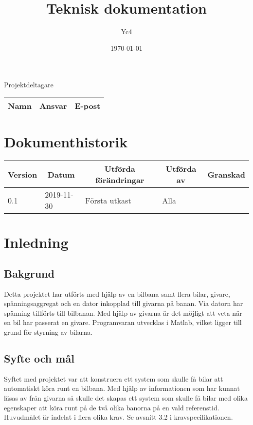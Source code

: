 \documentclass[10pt,oneside,swedish]{lips-no_customer}
\title{Teknisk dokumentation}
\author{Yc4}
\date{\today}
\begin{document}
\maketitle

\cleardoublepage
\makeprojectid

\begin{center}
  \Large Projektdeltagare
\end{center}
\begin{center}
  \begin{tabular}{|l|l|l|}
    \hline
    \textbf{Namn} & \textbf{Ansvar} & \textbf{E-post}\\
    \hline
  \end{tabular}
\end{center}

\section*{Dokumenthistorik}
\begin{tabular}{p{}|p{}|p{}|p{}|p{}} 
  \multicolumn{1}{c}{\bfseries Version} & 
  \multicolumn{1}{|c}{\bfseries Datum} & 
  \multicolumn{1}{|c}{\bfseries Utförda förändringar} & 
  \multicolumn{1}{|c}{\bfseries Utförda av} & 
  \multicolumn{1}{|c}{\bfseries Granskad}\\
  \hline
  \hline
  0.1 & 2019-11-30 & Första utkast & Alla & \\
  \hline
\end{tabular}

\cleardoublepage
{}\cfoot{\thepage}


\cleardoublepage
\tableofcontents
\cleardoublepage

\section{Inledning}
\subsection{Bakgrund}
Detta projektet har utförts med hjälp av en bilbana samt flera bilar, givare, spänningsaggregat och en dator inkopplad till givarna på banan. Via datorn har spänning tillförts till bilbanan. Med hjälp av givarna är det möjligt att veta när en bil har passerat en givare. Programvaran utvecklas i Matlab, vilket ligger till grund för styrning av bilarna. 
\subsection{Syfte och mål}
Syftet med projektet var att konstruera ett system som skulle få bilar att automatiskt köra runt en bilbana.
Med hjälp av informationen som har kunnat läsas av från givarna så skulle det
skapas ett system som skulle få bilar med olika egenskaper att köra runt på de två olika 
banorna på en vald referenstid. Huvudmålet är indelat i flera olika krav.
Se avsnitt 3.2 i kravspecifikationen.
\end{document}
